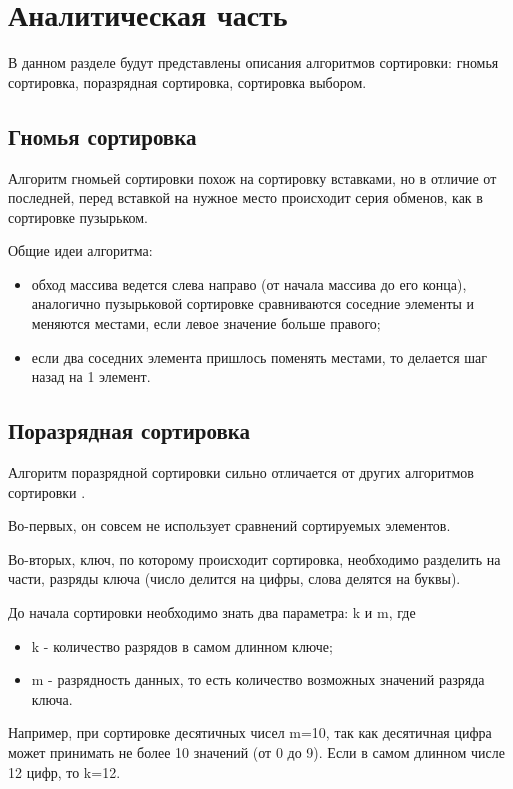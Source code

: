 \chapter{Аналитическая часть}
В данном разделе будут представлены описания алгоритмов сортировки: гномья сортировка, поразрядная сортировка, сортировка выбором.

\section{Гномья сортировка}
Алгоритм гномьей сортировки похож на сортировку вставками, но в отличие от последней, перед вставкой на нужное место происходит серия обменов, как в сортировке пузырьком.\cite{sorts_book}

Общие идеи алгоритма:
\begin{itemize}
	\item обход массива ведется слева направо (от начала массива до его конца), аналогично пузырьковой сортировке сравниваются соседние элементы и меняются местами, если левое значение больше правого;
	\item если два соседних элемента пришлось поменять местами, то делается шаг назад на 1 элемент.
\end{itemize}

\section{Поразрядная сортировка}
Алгоритм поразрядной сортировки сильно отличается от других алгоритмов сортировки \cite{radix_sort}.

Во-первых, он совсем не использует сравнений сортируемых элементов.

Во-вторых, ключ, по которому происходит сортировка, необходимо разделить на части, разряды ключа (число делится на цифры, слова делятся на буквы).

До начала сортировки необходимо знать два параметра: k и m, где
\begin{itemize}
    \item k - количество разрядов в самом длинном ключе;
    \item m - разрядность данных, то есть количество возможных значений разряда ключа.
\end{itemize}

Например, при сортировке десятичных чисел m=10, так как десятичная цифра может принимать не более 10 значений (от 0 до 9). Если в самом длинном числе 12 цифр, то k=12.

